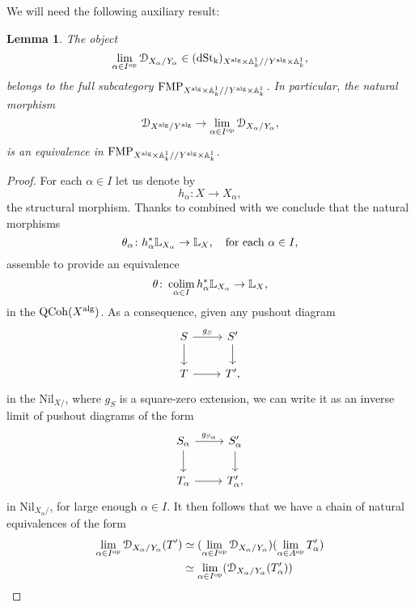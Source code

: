 \documentclass[10pt,a4paper,reqno]{amsart} %
\theoremstyle{plain}
\newtheorem{lem}[thm]{Lemma}
\theoremstyle{definition}
\theoremstyle{remark}
\numberwithin{equation}{section}
\begin{document}
We will need the following auxiliary result:

\begin{lem} \label{prop:colim_n_ge_0_X^n_to_deformation_is_an_equivalence}
    The object 
        \[\lim_{\alpha \in I ^\mathrm{op}} \mathcal D_{X_\alpha / Y_\alpha} \in (\mathrm{dSt_k})_{X^\mathrm{alg} \times \mathbb A^1_k/ /Y^\mathrm{alg} \times \mathbb A^1_k},\]
    belongs to the full subcategory $\mathrm{FMP}_{X^\mathrm{alg} \times \mathbb A^1_k/ /Y^\mathrm{alg} \times \mathbb A^1_k}$. In particular, the natural morphism
        \[
            \mathcal D_{X^\mathrm{alg}/ Y^\mathrm{alg}} \to \lim_{\alpha \in I ^\mathrm{op}} \mathcal D_{X_\alpha/ Y_\alpha},  
        \]
    is an equivalence in $\mathrm{FMP}_{X^\mathrm{alg} \times \mathbb A^1_k/ /Y^\mathrm{alg} \times \mathbb A^1_k}$.
\end{lem}

\begin{proof}  For each $\alpha \in I$ let us denote by
        \[
            h_\alpha \colon X \to X_\alpha,
        \]  
    the structural morphism. Thanks to \cite[Corollary 4.4.1.3]{Lurie_SAG} combined with \cite[Corollary  4.5.1.3]{Lurie_SAG} we conclude that the natural morphisms
        \[
            \theta_\alpha \colon h_\alpha^* \mathbb L_{X_\alpha} \to \mathbb L_{X} , \quad \textrm{for each } \alpha \in I,
        \]
    assemble to provide an equivalence
        \[
            \theta \colon \operatorname*{colim}_{\alpha \in I} h_\alpha^* \mathbb L_{X_\alpha} \to \mathbb L_X,   
        \]
    in the \infcat $\mathrm{QCoh}(X^\mathrm{alg})$. As a consequence, given any pushout diagram
        \[
        \begin{tikzcd}
            S \ar{r}{g_S} \ar{d} & S' \ar{d} \\
            T \ar{r} & T',
        \end{tikzcd}
        \]
    in the \infcat $\mathrm{Nil}_{X/ }$, where $g_S$ is a square-zero extension, we can write it as an inverse limit of pushout diagrams of the form
        \[
        \begin{tikzcd}
            S_\alpha \ar{r}{g_{S_\alpha}} \ar{d} & S'_\alpha \ar{d} \\
            T_\alpha \ar{r} & T'_\alpha,  
        \end{tikzcd}
        \]
    in $\mathrm{Nil}_{X_\alpha/ }$, for large enough $\alpha \in I$. It then follows that we have a chain of natural equivalences of the form
        \begin{align*}
            \lim_{\alpha \in I\op}\cD_{X_\alpha/ Y_\alpha} (T') & \simeq (\lim_{\alpha \in I\op}\cD_{X_\alpha/ Y_\alpha})(\lim_{\alpha \in A\op} T_\alpha ') \\
                                                                & \simeq \lim_{\alpha \in I\op} (\cD_{X_\alpha/ Y_\alpha}(T'_\alpha) )\\

\end{align*}
\end{proof}
\end{document}
